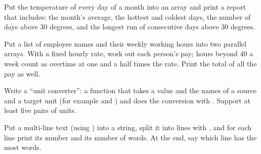 \exercise Put the temperature of every day of a month into an array and
print a report that includes: the month's average, the hottest and coldest
days, the number of days above 30 degrees, and the longest run of
consecutive days above 30 degrees.

\exercise Put a list of employee names and their weekly working hours into
two parallel arrays. With a fixed hourly rate, work out each person's pay;
hours beyond 40 a week count as overtime at one and a half times the rate.
Print the total of all the pay as well.

\exercise Write a ``unit converter'': a function that takes a value and the
names of a source and a target unit (for example  and
) and does the conversion with . Support at least
five pairs of units.

\exercise Put a multi-line text (using ) into a
string, split it into lines with , and for
each line print its number and its number of words. At the end, say which
line has the most words.
